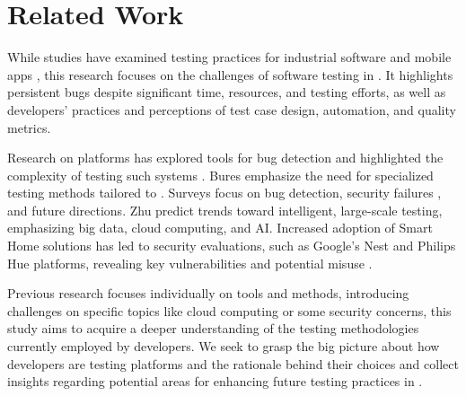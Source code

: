 \section{Related Work}\label{sec:related_work}



While studies have examined testing practices for industrial software \cite{hynninen18,kochhar_practitioners_2019} and mobile apps \cite{vasquez17,Wang2019LookingFT,linares-vasquez_enabling_2017}, this research focuses on the challenges of software testing in \iot. It highlights persistent bugs despite significant time, resources, and testing efforts, as well as developers' practices and perceptions of test case design, automation, and quality metrics.

Research on \iot platforms has explored tools for bug detection \cite{9306923,bosmans_testing_2019,9014711, zhang_trace2tap_2020,brackenbury_how_2019} and highlighted the complexity of testing such systems \cite{8919324, REGGIO2020100313}. Bures \etal \cite{10.1007/978-3-030-58768-0_6} emphasize the need for specialized testing methods tailored to \iot. Surveys focus on bug detection, security failures \cite{9402092,electronics11091502,9878283,manandhar_helion_2019,jin_understanding_2022,AHANGER2022108771,ami_why_2022,makhshari2021}, and future directions. Zhu \etal \cite{zhu_survey_2022} predict trends toward intelligent, large-scale testing, emphasizing big data, cloud computing, and AI. Increased adoption of Smart Home solutions has led to security evaluations, such as Google's Nest and Philips Hue platforms, revealing key vulnerabilities and potential misuse \cite{kafle_study_2019,nest}.


Previous research focuses individually on tools and methods, introducing challenges on specific topics like cloud computing or some security concerns, this study aims to acquire a deeper understanding of the testing methodologies currently employed by \iot developers. We seek to grasp the big picture about how developers are testing \iot platforms and the rationale behind their choices and collect insights regarding potential areas for enhancing future testing practices in \iot. 

